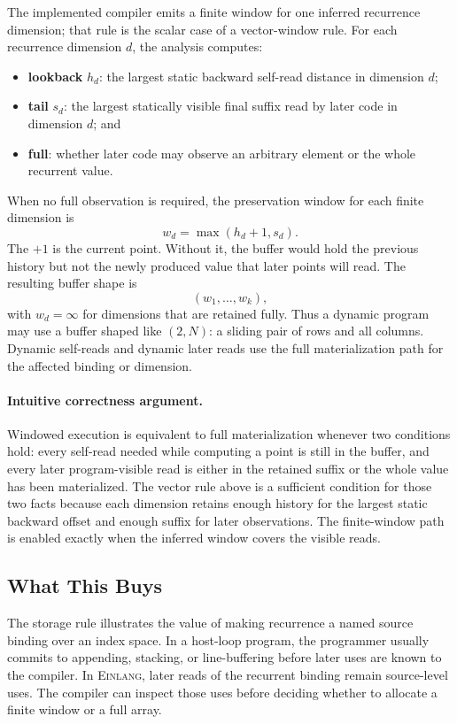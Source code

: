 \documentclass[sigplan,screen,nonacm]{acmart}
\newcommand{\einlang}{\textsc{Einlang}}
\begin{document}
The implemented compiler emits a finite window for one inferred recurrence dimension; that rule is the scalar case of a vector-window rule. For each recurrence dimension $d$, the analysis computes:
\begin{itemize}
\item \textbf{lookback} $h_d$: the largest static backward self-read distance in dimension $d$;
\item \textbf{tail} $s_d$: the largest statically visible final suffix read by later code in dimension $d$; and
\item \textbf{full}: whether later code may observe an arbitrary element or the whole recurrent value.
\end{itemize}
When no full observation is required, the preservation window for each finite dimension is
\[
w_d = \max(h_d+1,s_d).
\]
The $+1$ is the current point. Without it, the buffer would hold the previous history but not the newly produced value that later points will read. The resulting buffer shape is
\[
(w_1,\ldots,w_k),
\]
with $w_d=\infty$ for dimensions that are retained fully. Thus a dynamic program may use a buffer shaped like $(2,N)$: a sliding pair of rows and all columns. Dynamic self-reads and dynamic later reads use the full materialization path for the affected binding or dimension.

\paragraph{Intuitive correctness argument.}
Windowed execution is equivalent to full materialization whenever two conditions hold: every self-read needed while computing a point is still in the buffer, and every later program-visible read is either in the retained suffix or the whole value has been materialized. The vector rule above is a sufficient condition for those two facts because each dimension retains enough history for the largest static backward offset and enough suffix for later observations. The finite-window path is enabled exactly when the inferred window covers the visible reads.

\subsection{What This Buys}

The storage rule illustrates the value of making recurrence a named source binding over an index space. In a host-loop program, the programmer usually commits to appending, stacking, or line-buffering before later uses are known to the compiler. In \einlang{}, later reads of the recurrent binding remain source-level uses. The compiler can inspect those uses before deciding whether to allocate a finite window or a full array.
\end{document}
